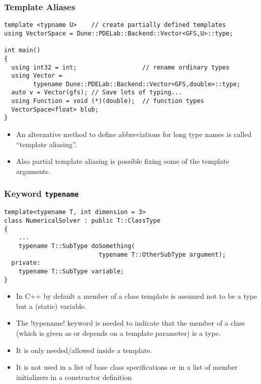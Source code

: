 \begin{frame}[fragile]
\frametitle{Template Aliases}
\begin{lstlisting}
template <typname U>    // create partially defined templates 
using VectorSpace = Dune::PDELab::Backend::Vector<GFS,U>::type;

int main()
{
  using int32 = int;                  // rename ordinary types
  using Vector = 
        typename Dune::PDELab::Backend::Vector<GFS,double>::type;
  auto v = Vector(gfs); // Save lots of typing...
  using Function = void (*)(double);  // function types
  VectorSpace<float> blub;
}
\end{lstlisting}


\begin{itemize}
\item An alternative method to define abbreviations for long type names is called ``template aliasing''.
\item Also partial template aliasing is possible fixing some of the template arguments.
\end{itemize}

\end{frame}



\begin{frame}[fragile]
\frametitle{Keyword \texttt{typename}}
\begin{lstlisting}
template<typename T, int dimension = 3>
class NumericalSolver : public T::ClassType
{
    ...
    typename T::SubType doSomething(
                          typename T::OtherSubType argument);
  private:
    typename T::SubType variable;
}
\end{lstlisting}
\begin{itemize}%
\item In C++ by default a member of a class template is assumed not to be a type but
a (static) variable.
\item The \inline!typename! keyword is needed to
indicate that the member of a class (which is given as or depends on a template
parameter) is a type.
\item It is only needed/allowed inside a template.
\item It is not used in a list of base class specifications or in a list of member initializers
in a constructor definition
\end{itemize}

\end{frame}


